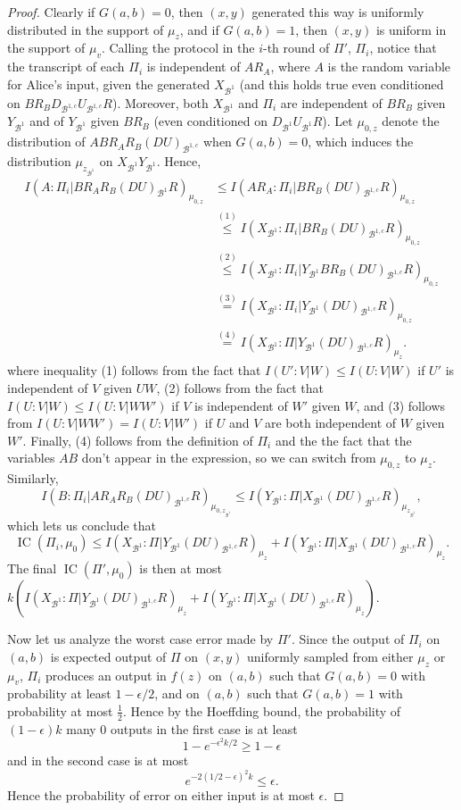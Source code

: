 \documentclass[10pt,a4paper]{article}
\theoremstyle{definition}
\renewcommand{\>}{\rangle}
\newcommand{\<}{\langle}
\newcommand{\cB}{\mathcal{B}}
\DeclareMathOperator{\IC}{IC}
\begin{document}
\begin{proof}
Clearly if $G(a,b)=0$, then $(x,y)$ generated this way is uniformly distributed in the support of $\mu_z$, and if $G(a,b)=1$, then $(x,y)$ is uniform in the support of $\mu_v$. Calling the protocol in the $i$-th round of $\Pi'$, $\Pi_i$, notice that the transcript of each $\Pi_i$ is independent of $AR_A$, where $A$ is the random variable for Alice's input, given the generated $X_{\cB^1}$ (and this holds true even conditioned on $BR_BD_{\cB^{1,c}}U_{\cB^{1,c}}R$). Moreover, both $X_{\cB^1}$ and $\Pi_i$ are independent of $BR_B$ given $Y_{\cB^1}$ and of $Y_{\cB^1}$ given $BR_B$ (even conditioned on $D_{\cB^1}U_{\cB^1}R$). Let $\mu_{0,z}$ denote the distribution of $ABR_AR_B(DU)_{\cB^{1,c}}$ when $G(a,b)=0$, which induces the distribution $\mu_{z_{\cB^1}}$ on $X_{\cB^1}Y_{\cB^1}$. Hence,
\begin{align*}
I(A:\Pi_i|BR_AR_B(DU)_{\cB^1}R)_{\mu_{0,z}} & \leq I(AR_A:\Pi_i|BR_B(DU)_{\cB^{1,c}}R)_{\mu_{0,z}} \\
 & \overset{(1)}{\leq} I(X_{\cB^1}:\Pi_i|BR_B(DU)_{\cB^{1,c}}R)_{\mu_{0,z}} \\
 & \overset{(2)}{\leq} I(X_{\cB^1}:\Pi_i|Y_{\cB^1}BR_B(DU)_{\cB^{1,c}}R)_{\mu_{0,z}} \\
 & \overset{(3)}{=} I(X_{\cB^1}:\Pi_i|Y_{\cB^1}(DU)_{\cB^{1,c}}R)_{\mu_{0,z}} \\
 & \overset{(4)}{=} I(X_{\cB^1}:\Pi|Y_{\cB^1}(DU)_{\cB^{1,c}}R)_{\mu_z}.
\end{align*}
where inequality (1) follows from the fact that $I(U':V|W) \leq I(U:V|W)$ if $U'$ is independent of $V$ given $UW$, (2) follows from the fact that $I(U:V|W) \leq I(U:V|WW')$ if $V$ is independent of $W'$ given $W$, and (3) follows from $I(U:V|WW')=I(U:V|W')$ if $U$ and $V$ are both independent of $W$ given $W'$. Finally, (4) follows from the definition of $\Pi_i$ and the the fact that the variables $AB$ don't appear in the expression, so we can switch from $\mu_{0,z}$ to $\mu_z$. Similarly,
\[ I(B:\Pi_i|AR_AR_B(DU)_{\cB^{1,c}}R)_{\mu_{0,z_{\cB^1}}} \leq I(Y_{\cB^1}:\Pi|X_{\cB^1}(DU)_{\cB^{1,c}}R)_{\mu_{z_{\cB^1}}},\]
which lets us conclude that
\[\IC(\Pi_i,\mu_0) \leq I(X_{\cB^1}:\Pi|Y_{\cB^1}(DU)_{\cB^{1,c}}R)_{\mu_z} + I(Y_{\cB^1}:\Pi|X_{\cB^1}(DU)_{\cB^{1,c}}R)_{\mu_z}.\]
The final $\IC(\Pi',\mu_0)$ is then at most $k(I(X_{\cB^1}:\Pi|Y_{\cB^1}(DU)_{\cB^{1,c}}R)_{\mu_z} + I(Y_{\cB^1}:\Pi|X_{\cB^1}(DU)_{\cB^{1,c}}R)_{\mu_z})$.

Now let us analyze the worst case error made by $\Pi'$. Since the output of $\Pi_i$ on $(a,b)$ is expected output of $\Pi$ on $(x,y)$ uniformly sampled from either $\mu_z$ or $\mu_v$, $\Pi_i$ produces an output in $f(z)$ on $(a,b)$ such that $G(a,b)=0$ with probability at least $1-\epsilon/2$, and on $(a,b)$ such that $G(a,b)=1$ with probability at most $\frac{1}{2}$. Hence by the Hoeffding bound, the probability of $(1-\epsilon)k$ many 0 outputs in the first case is at least
\[ 1-e^{-\epsilon^2k/2} \geq 1- \epsilon\]
and in the second case is at most
\[ e^{-2(1/2-\epsilon)^2k} \leq \epsilon.\]
Hence the probability of error on either input is at most $\epsilon$.
\end{proof}
\end{document}
